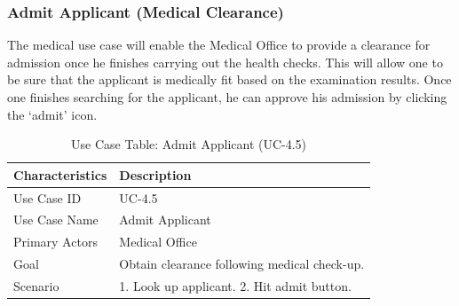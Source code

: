 \subsubsection{Admit Applicant (Medical Clearance)}
The medical use case will enable the Medical Office to provide a clearance for admission once he finishes carrying out the health checks. This will allow one to be sure that the applicant is medically fit based on the examination results. Once one finishes searching for the applicant, he can approve his admission by clicking the ‘admit’ icon.
\begin{table}[H]
    \centering
    \small
    \renewcommand{\arraystretch}{1.4}
    \caption{Use Case Table: Admit Applicant (UC-4.5)} %
    \label{tab:admit-applicant-medical}
    \begin{tabularx}{\textwidth}{|l|X|}
        \hline
        \rowcolor[gray]{0.9} {Characteristics} & {Description} \\ \hline
        Use Case ID & UC-4.5 \\ \hline
        Use Case Name & Admit Applicant \\ \hline
        Primary Actors & Medical Office \\ \hline
        Goal & Obtain clearance following medical check-up. \\ \hline
        Scenario & 1. Look up applicant. 2. Hit admit button. \\ \hline
    \end{tabularx}
\end{table}
\FloatBarrier